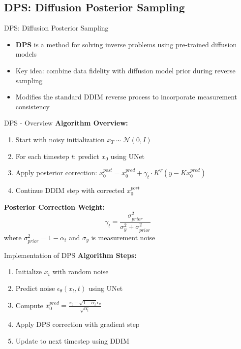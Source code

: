 \subsection{DPS: Diffusion Posterior Sampling}
\begin{frame}{DPS: Diffusion Posterior Sampling}
  \begin{itemize}
    \item \textbf{DPS} is a method for solving inverse problems using pre-trained diffusion models
    \item Key idea: combine data fidelity with diffusion model prior during reverse sampling
    \item Modifies the standard DDIM reverse process to incorporate measurement consistency
  \end{itemize}
\end{frame}


\begin{frame}{DPS - Overview}
  \textbf{Algorithm Overview:}
  \begin{enumerate}
    \item Start with noisy initialization $x_T \sim \mathcal{N}(0, I)$
    \item For each timestep $t$: predict $x_0$ using UNet
    \item Apply posterior correction: $x_0^{post} = x_0^{pred} + \gamma_t \cdot K^T(y - K x_0^{pred})$
    \item Continue DDIM step with corrected $x_0^{post}$
  \end{enumerate}

  \textbf{Posterior Correction Weight:}
  $$\gamma_t = \frac{\sigma_{prior}^2}{\sigma_y^2 + \sigma_{prior}^2}$$
  where $\sigma_{prior}^2 = 1 - \alpha_t$ and $\sigma_y$ is measurement noise
\end{frame}

\begin{frame}{Implementation of DPS}
  \textbf{Algorithm Steps:}
  \begin{enumerate}
    \item Initialize $x_t$ with random noise
    \item Predict noise $\epsilon_\theta(x_t, t)$ using UNet
    \item Compute $x_0^{pred} = \frac{x_t - \sqrt{1-\alpha_t} \epsilon_\theta}{\sqrt{\alpha_t}}$
    \item Apply DPS correction with gradient step
    \item Update to next timestep using DDIM
  \end{enumerate}
\end{frame}
